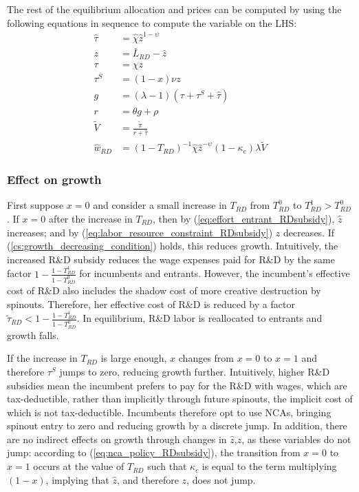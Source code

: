 \documentclass[11pt,english]{article}
\begin{document}
The rest of the equilibrium allocation and prices can be computed by using the following equations in sequence to compute the variable on the LHS:
\begin{align}
	\hat{\tau} &= \hat{\chi} \hat{z}^{1-\psi} \\
	z &= \bar{L}_{RD} - \hat{z} \label{eq:labor_resource_constraint_RDsubsidy}\\ 
	\tau &= \chi z \\
	\tau^S &= (1-x) \nu z \\
	g &= (\lambda - 1) (\tau + \tau^S + \hat{\tau}) \\
	r &= \theta g + \rho \\
	\tilde{V} &= \frac{\tilde{\pi}}{r + \hat{\tau}} \\ 
	\hat{w}_{RD} &= (1-T_{RD})^{-1}\hat{\chi} \hat{z}^{-\psi} (1-\kappa_e) \lambda \tilde{V} \label{eq:wage_rd_labor_RDsubsidy}
\end{align}

\subsubsection{Effect on growth}

First suppose $x = 0$ and consider a small increase in $T_{RD}$ from $T_{RD}^0$ to $T_{RD}^1 > T_{RD}^0$. If $x = 0$ after the increase in $T_{RD}$, then by (\ref{eq:effort_entrant_RDsubsidy}), $\hat{z}$ increases; and by (\ref{eq:labor_resource_constraint_RDsubsidy}) $z$ decreases. If (\ref{cs:growth_decreasing_condition}) holds, this reduces growth. Intuitively, the increased R\&D subsidy reduces the wage expenses paid for R\&D by the same factor $1-\frac{1-T_{RD}^1}{1-T_{RD}^0}$ for incumbents and entrants. However, the incumbent's effective cost of R\&D also includes the shadow cost of more creative destruction by spinouts. Therefore, her effective cost of R\&D is reduced by a factor $\tilde{\tau}_{RD} < 1-\frac{1-T_{RD}^1}{1-T_{RD}^0}$. In equilibrium, R\&D labor is reallocated to entrants and growth falls.

If the increase in $T_{RD}$ is large enough, $x$ changes from $x = 0$ to $x = 1$ and therefore $\tau^S$ jumps to zero, reducing growth further. Intuitively, higher R\&D subsidies mean the incumbent prefers to pay for the R\&D with wages, which are tax-deductible, rather than implicitly through future spinouts, the implicit cost of which is not tax-deductible. Incumbents therefore opt to use NCAs, bringing spinout entry to zero and reducing growth by a discrete jump. In addition, there are no indirect effects on growth through changes in $\hat{z}$,$z$, as these variables do not jump: according to (\ref{eq:nca_policy_RDsubsidy}), the transition from $x= 0$ to $x =1$ occurs at the value of $T_{RD}$ such that $\kappa_c$ is equal to the term multiplying $(1-x)$, implying that $\hat{z}$, and therefore $z$, does not jump.
\end{document}
